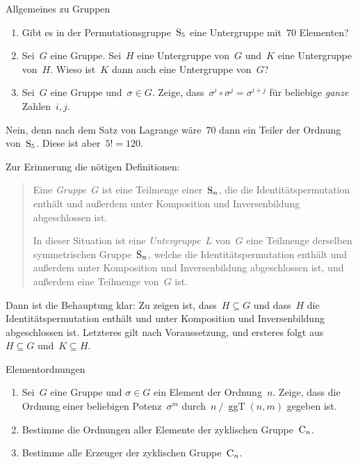 \documentclass{algblatt}
\begin{document}
\vspace*{-1.5cm}

\begin{aufgabe}{Allgemeines zu Gruppen}
\begin{enumerate}
\item Gibt es in der Permutationsgruppe~$\mathrm{S}_5$ eine Untergruppe mit~$70$
Elementen?

\item Sei~$G$ eine Gruppe. Sei~$H$ eine Untergruppe von~$G$ und~$K$ eine
Untergruppe von~$H$. Wieso ist~$K$ dann auch eine Untergruppe von~$G$?

\item Sei~$G$ eine Gruppe und~$\sigma \in G$. Zeige, dass~$\sigma^i \circ
\sigma^j = \sigma^{i + j}$ für beliebige \emph{ganze} Zahlen~$i,j$.
\end{enumerate}

\begin{loesungE}
\item Nein, denn nach dem Satz von Lagrange wäre~$70$ dann ein Teiler der
Ordnung von~$\mathrm{S}_5$. Diese ist aber~$5! = 120$.

\item Zur Erinnerung die nötigen Definitionen:
\begin{quote}
  Eine \emph{Gruppe}~$G$ ist eine Teilmenge einer~$\mathrm{S}_n$, die die
  Identitätspermutation enthält und außerdem unter
  Komposition und Inversenbildung abgeschlossen ist.

  In dieser Situation ist eine \emph{Untergruppe}~$L$ von~$G$ eine
  Teilmenge derselben symmetrischen Gruppe~$\mathrm{S}_n$, welche die 
  Identitätspermutation enthält und außerdem unter
  Komposition und Inversenbildung abgeschlossen ist, und außerdem eine
  Teilmenge von~$G$ ist.
\end{quote}
Dann ist die Behauptung klar: Zu zeigen ist, dass~$H \subseteq G$ und dass~$H$
die Identitätspermutation enthält und unter Komposition und Inversenbildung
abgeschlossen ist. Letzteres gilt nach Voraussetzung, und ersteres folgt aus~$H
\subseteq G$ und~$K \subseteq H$.
\end{loesungE}
\end{aufgabe}

\begin{aufgabe}{Elementordnungen}
\begin{enumerate}
\item Sei~$G$ eine Gruppe und $\sigma \in G$ ein Element der Ordnung~$n$.
Zeige, dass die Ordnung einer be\-lie\-bi\-gen Potenz~$\sigma^m$ durch~$n \mathrel{/}
\operatorname{ggT}(n,m)$ gegeben ist.

\item Bestimme die Ordnungen aller Elemente der zyklischen Gruppe~$\mathrm{C}_n$.

\item Bestimme alle Erzeuger der zyklischen Gruppe~$\mathrm{C}_n$.
\end{enumerate}
\end{aufgabe}
\end{document}
